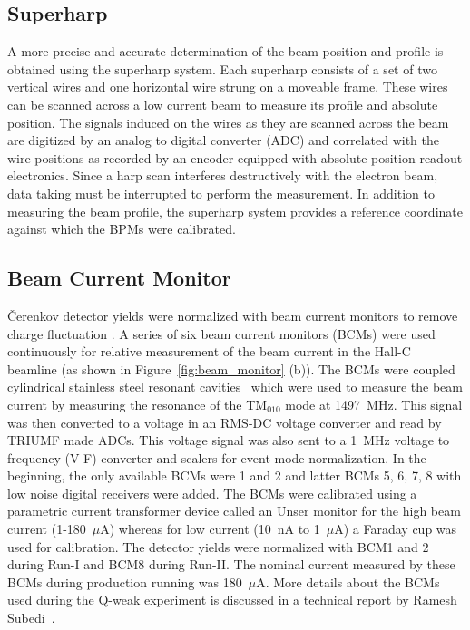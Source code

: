 \subsection{Superharp}%
\label{Superharp}

A more precise and accurate determination of the beam position and profile is obtained using the superharp system. Each superharp consists of a set of two vertical wires and one horizontal wire strung on a moveable frame. These wires can be scanned across a low current beam to measure its profile and absolute position. The signals induced on the wires as they are scanned across the beam are digitized by an analog to digital converter (ADC) and correlated with the wire positions as recorded by an encoder equipped with absolute position readout electronics. Since a harp scan interferes destructively with the electron beam, data taking must be interrupted to perform the measurement. In addition to measuring the beam profile, the superharp system provides a reference coordinate against which the BPMs were calibrated.


\subsection{Beam Current Monitor}%
\label{Beam Current Monitor}

\v{C}erenkov detector yields were normalized with beam current monitors to remove charge fluctuation . A series of six beam current monitors (BCMs) were used continuously for relative measurement of the beam current in the Hall-C beamline (as shown in Figure~\ref{fig:beam_monitor} (b)). The BCMs were coupled cylindrical stainless steel resonant cavities~\cite{bclasie,nur_kaon_thesis} which were used to measure the beam current by measuring the resonance of the TM$_{010}$ mode at 1497~MHz. This signal was then converted to a voltage in an RMS-DC voltage converter and read by TRIUMF made ADCs. This voltage signal was also sent to a 1~MHz voltage to frequency (V-F) converter and scalers for event-mode normalization. 
In the beginning, the only available BCMs were 1 and 2 and latter BCMs 5, 6, 7, 8 with low noise digital receivers were added. 
The BCMs were calibrated using a parametric current transformer device called an Unser monitor for the high beam current (1-180~$\mu$A) whereas for low current (10~nA to 1~$\mu$A) a Faraday cup was used for calibration.
The detector yields were normalized with BCM1 and 2 during Run-I and BCM8 during Run-II. The nominal current measured by these BCMs during production running was 180~$\mu$A. More details about the BCMs used during the Q-weak experiment is discussed in a technical report by Ramesh Subedi~\cite{ramesh_bcm}.


